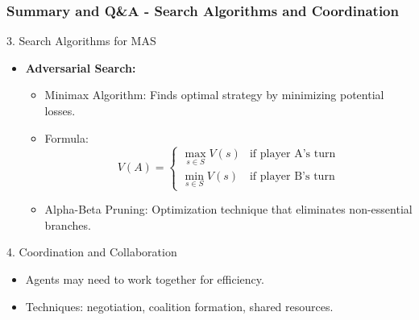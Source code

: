 \documentclass[aspectratio=169]{beamer}
\begin{document}
\begin{frame}[fragile]
    \frametitle{Summary and Q\&A - Search Algorithms and Coordination}

    \begin{block}{3. Search Algorithms for MAS}
        \begin{itemize}
            \item \textbf{Adversarial Search:} 
            \begin{itemize}
                \item Minimax Algorithm: Finds optimal strategy by minimizing potential losses.
                \item Formula:
                \begin{equation}
                    V(A) = 
                    \begin{cases} 
                    \max_{s \in S} V(s) & \text{if player A's turn} \\
                    \min_{s \in S} V(s) & \text{if player B's turn}
                    \end{cases}
                \end{equation}
                \item Alpha-Beta Pruning: Optimization technique that eliminates non-essential branches.
            \end{itemize}
        \end{itemize}
    \end{block}

    \begin{block}{4. Coordination and Collaboration}
        \begin{itemize}
            \item Agents may need to work together for efficiency.
            \item Techniques: negotiation, coalition formation, shared resources.
        \end{itemize}
    \end{block}
\end{frame}
\end{document}
